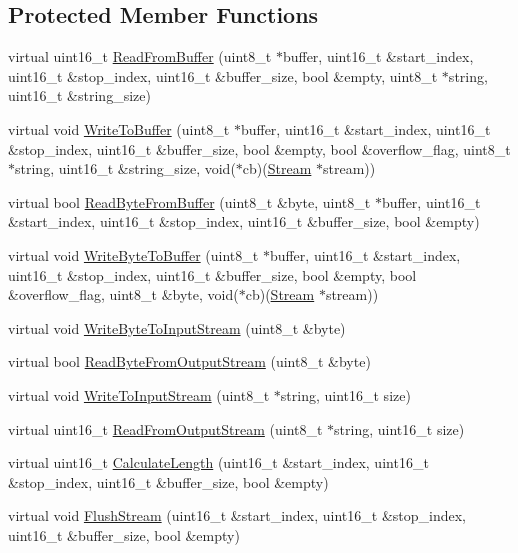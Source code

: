 \subsection*{Protected Member Functions}
\begin{DoxyCompactItemize}
\item 
virtual uint16\-\_\-t \hyperlink{class_stream_a752930f620aed4a3a80b243ce66e57ca}{Read\-From\-Buffer} (uint8\-\_\-t $\ast$buffer, uint16\-\_\-t \&start\-\_\-index, uint16\-\_\-t \&stop\-\_\-index, uint16\-\_\-t \&buffer\-\_\-size, bool \&empty, uint8\-\_\-t $\ast$string, uint16\-\_\-t \&string\-\_\-size)
\item 
virtual void \hyperlink{class_stream_a5ba59861c0ab5977d7c92d6dcd72807c}{Write\-To\-Buffer} (uint8\-\_\-t $\ast$buffer, uint16\-\_\-t \&start\-\_\-index, uint16\-\_\-t \&stop\-\_\-index, uint16\-\_\-t \&buffer\-\_\-size, bool \&empty, bool \&overflow\-\_\-flag, uint8\-\_\-t $\ast$string, uint16\-\_\-t \&string\-\_\-size, void($\ast$cb)(\hyperlink{class_stream}{Stream} $\ast$stream))
\item 
virtual bool \hyperlink{class_stream_a32e449304f65b5571fe848a503fc9d68}{Read\-Byte\-From\-Buffer} (uint8\-\_\-t \&byte, uint8\-\_\-t $\ast$buffer, uint16\-\_\-t \&start\-\_\-index, uint16\-\_\-t \&stop\-\_\-index, uint16\-\_\-t \&buffer\-\_\-size, bool \&empty)
\item 
virtual void \hyperlink{class_stream_a7b6a9a1f96e0f524e950863215128911}{Write\-Byte\-To\-Buffer} (uint8\-\_\-t $\ast$buffer, uint16\-\_\-t \&start\-\_\-index, uint16\-\_\-t \&stop\-\_\-index, uint16\-\_\-t \&buffer\-\_\-size, bool \&empty, bool \&overflow\-\_\-flag, uint8\-\_\-t \&byte, void($\ast$cb)(\hyperlink{class_stream}{Stream} $\ast$stream))
\item 
virtual void \hyperlink{class_stream_a0784d377cc92ddde7cc730be17a1a3aa}{Write\-Byte\-To\-Input\-Stream} (uint8\-\_\-t \&byte)
\item 
virtual bool \hyperlink{class_stream_a3f8e3c5513c6b8605c0fed74a3ed22bc}{Read\-Byte\-From\-Output\-Stream} (uint8\-\_\-t \&byte)
\item 
virtual void \hyperlink{class_stream_aa2f020721d273ce821ccf626e5eb773c}{Write\-To\-Input\-Stream} (uint8\-\_\-t $\ast$string, uint16\-\_\-t size)
\item 
virtual uint16\-\_\-t \hyperlink{class_stream_ab458be72cc54330f518f5ab35ab84106}{Read\-From\-Output\-Stream} (uint8\-\_\-t $\ast$string, uint16\-\_\-t size)
\item 
virtual uint16\-\_\-t \hyperlink{class_stream_a8047b62e7dcfe0e50210b3e40c7aa6eb}{Calculate\-Length} (uint16\-\_\-t \&start\-\_\-index, uint16\-\_\-t \&stop\-\_\-index, uint16\-\_\-t \&buffer\-\_\-size, bool \&empty)
\item 
virtual void \hyperlink{class_stream_a435b1b065846d3b24969cfc6dacabc6b}{Flush\-Stream} (uint16\-\_\-t \&start\-\_\-index, uint16\-\_\-t \&stop\-\_\-index, uint16\-\_\-t \&buffer\-\_\-size, bool \&empty)
\end{DoxyCompactItemize}
